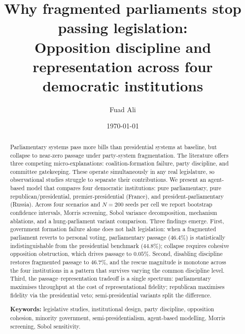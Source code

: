 \documentclass[11pt]{article}
\title{%
    Why fragmented parliaments stop passing legislation: \\
    Opposition discipline and representation across four democratic institutions
}
\author{%
    Fuad Ali
}
\date{\today}
\begin{document}
\maketitle

\begin{abstract}
\noindent
Parliamentary systems pass more bills than presidential systems at baseline,
but collapse to near-zero passage under party-system fragmentation. The
literature offers three competing micro-explanations: coalition-formation
failure, party discipline, and committee gatekeeping. These operate
simultaneously in any real legislature, so observational studies struggle to
separate their contributions. We present an agent-based model that compares
four democratic institutions: pure parliamentary, pure republican/presidential,
premier-presidential (France), and president-parliamentary (Russia). Across
four scenarios and $N=200$ seeds per cell we report bootstrap confidence
intervals, Morris screening, Sobol variance decomposition, mechanism
ablations, and a hung-parliament variant comparison. Three findings emerge.
First, government formation failure alone does not halt legislation: when a
fragmented parliament reverts to personal voting, parliamentary passage
($46.4\%$) is statistically indistinguishable from the presidential benchmark
($44.8\%$); collapse requires cohesive opposition obstruction, which drives
passage to $0.05\%$. Second, disabling discipline restores fragmented passage to
$46.7\%$, and the rescue magnitude is monotone across the four institutions
in a pattern that survives varying the common discipline level. Third, the
passage--representation tradeoff is a single spectrum: parliamentary
maximises throughput at the cost of representational fidelity; republican
maximises fidelity via the presidential veto; semi-presidential variants
split the difference.

\medskip
\noindent\textbf{Keywords:} legislative studies, institutional design,
party discipline, opposition cohesion, minority government,
semi-presidentialism, agent-based modelling, Morris screening, Sobol
sensitivity.
\end{abstract}
\end{document}
